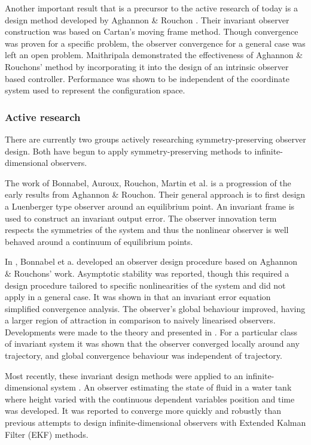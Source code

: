 Another important result that is a precursor to the active research of today is a design method developed by Aghannon \& Rouchon \cite{aghannan2002invariant}. Their invariant observer construction was based on Cartan's moving frame method. Though convergence was proven for a specific problem, the observer convergence for a general case was left an open problem. Maithripala \cite{maithripala2005intrinsic} demonstrated the effectiveness of Aghannon \& Rouchons' method by incorporating it into the design of an intrinsic observer based controller. Performance was shown to be independent of the coordinate system used to represent the configuration space.

\subsubsection{Active research}
There are currently two groups actively researching symmetry-preserving observer design.  Both have begun to apply symmetry-preserving methods to infinite-dimensional observers.

The work of Bonnabel, Auroux, Rouchon, Martin et al. is a progression of the early results from Aghannon \& Rouchon. Their general approach is to first design a Luenberger type observer around an equilibrium point. An invariant frame is used to construct an invariant output error. The observer innovation term respects the symmetries of the system and thus the nonlinear observer is well behaved around a continuum of equilibrium points. 

In \cite{bonnabel2005invariant}, Bonnabel et a. developed an observer design procedure based on Aghannon \& Rouchons' work. Asymptotic stability was reported, though this required a design procedure tailored to specific nonlinearities of the system and did not apply in a general case.
It was shown in \cite{bonnabel2008symmetry} that an invariant error equation simplified convergence analysis. The observer's global behaviour improved, having a larger region of attraction in comparison to naively linearised observers.
Developments were made to the theory and presented in \cite{bonnabel2009non}. For a particular class of invariant system it was shown that the observer converged locally around any trajectory, and global convergence behaviour was independent of trajectory.

Most recently, these invariant design methods were applied to an infinite-dimensional system \cite{auroux2011symmetry}. An observer estimating the state of fluid in a water tank where height varied with the continuous dependent variables position and time was developed. It was reported to converge more quickly and robustly than previous attempts to design infinite-dimensional observers with Extended Kalman Filter (EKF) methods.

